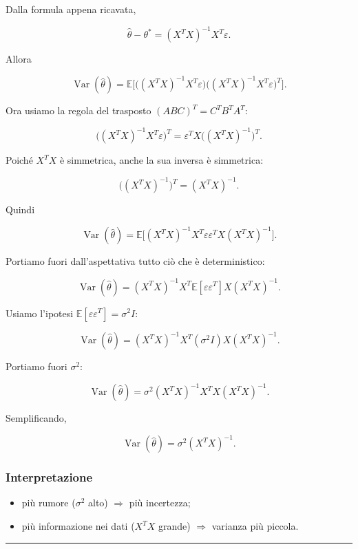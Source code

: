 \documentclass{article}
\providecommand{\tightlist}{%
  \setlength{\itemsep}{0pt}\setlength{\parskip}{0pt}}
\begin{document}
Dalla formula appena ricavata,

\[
\hat\theta-\theta^*=(X^TX)^{-1}X^T\varepsilon.
\]

Allora

\[
\operatorname{Var}(\hat\theta)
=
\mathbb{E}\Big[
\big((X^TX)^{-1}X^T\varepsilon\big)
\big((X^TX)^{-1}X^T\varepsilon\big)^T
\Big].
\]

Ora usiamo la regola del trasposto \((ABC)^T=C^TB^TA^T\):

\[
\big((X^TX)^{-1}X^T\varepsilon\big)^T
=
\varepsilon^TX\big((X^TX)^{-1}\big)^T.
\]

Poiché \(X^TX\) è simmetrica, anche la sua inversa è simmetrica:

\[
\big((X^TX)^{-1}\big)^T=(X^TX)^{-1}.
\]

Quindi

\[
\operatorname{Var}(\hat\theta)
=
\mathbb{E}\Big[
(X^TX)^{-1}X^T\varepsilon\varepsilon^TX(X^TX)^{-1}
\Big].
\]

Portiamo fuori dall'aspettativa tutto ciò che è deterministico:

\[
\operatorname{Var}(\hat\theta)
=
(X^TX)^{-1}X^T
\mathbb{E}[\varepsilon\varepsilon^T]
X(X^TX)^{-1}.
\]

Usiamo l'ipotesi \(\mathbb{E}[\varepsilon\varepsilon^T]=\sigma^2 I\):

\[
\operatorname{Var}(\hat\theta)
=
(X^TX)^{-1}X^T(\sigma^2 I)X(X^TX)^{-1}.
\]

Portiamo fuori \(\sigma^2\):

\[
\operatorname{Var}(\hat\theta)
=
\sigma^2(X^TX)^{-1}X^TX(X^TX)^{-1}.
\]

Semplificando,

\[
\operatorname{Var}(\hat\theta)=\sigma^2(X^TX)^{-1}.
\]

\subsubsection{Interpretazione}\label{interpretazione-4}

\begin{itemize}
\tightlist
\item
  più rumore (\(\sigma^2\) alto) \(\Rightarrow\) più incertezza;
\item
  più informazione nei dati (\(X^TX\) grande) \(\Rightarrow\) varianza
  più piccola.
\end{itemize}

\begin{center}\rule{0.5\linewidth}{0.5pt}\end{center}
\end{document}
